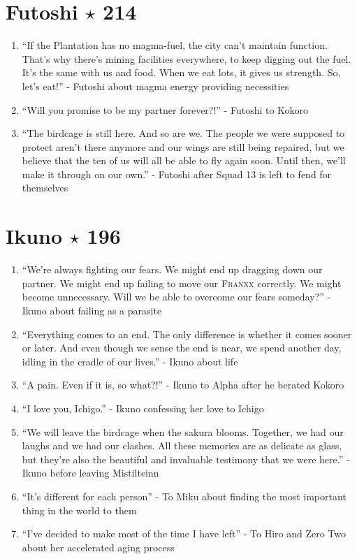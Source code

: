 \documentclass{book}
\numberwithin{equation}{section}
\begin{document}
\section{Futoshi $\star$ 214}
\begin{enumerate}
    \item ``If the Plantation has no magma-fuel, the city can't maintain function. That's why there's mining facilities everywhere, to keep digging out the fuel. It's the same with us and food. When we eat lots, it gives us strength. So, let's eat!'' - Futoshi about magma energy providing necessities 
    \item ``Will you promise to be my partner forever?!'' - Futoshi to Kokoro
    \item ``The birdcage is still here. And so are we. The people we were supposed to protect aren't there anymore and our wings are still being repaired, but we believe that the ten of us will all be able to fly again soon. Until then, we'll make it through on our own.'' - Futoshi after Squad 13 is left to fend for themselves
\end{enumerate}

\section{Ikuno $\star$ 196}
\begin{enumerate}
    \item ``We're always fighting our fears. We might end up dragging down our partner. We might end up failing to move our \textsc{Franxx} correctly. We might become unnecessary. Will we be able to overcome our fears someday?'' - Ikuno about failing as a parasite
    \item ``Everything comes to an end. The only difference is whether it comes sooner or later. And even though we sense the end is near, we spend another day, idling in the cradle of our lives.'' - Ikuno about life
    \item ``A pain. Even if it is, so what?!'' - Ikuno to Alpha after he berated Kokoro
    \item ``I love you, Ichigo.'' - Ikuno confessing her love to Ichigo
    \item ``We will leave the birdcage when the sakura blooms. Together, we had our laughs and we had our clashes. All these memories are as delicate as glass, but they're also the beautiful and invaluable testimony that we were here.'' - Ikuno before leaving Mistilteinn
    \item ``It's different for each person'' - To Miku about finding the most important thing in the world to them
    \item ``I've decided to make most of the time I have left'' - To Hiro and Zero Two about her accelerated aging process
\end{enumerate}
\end{document}
